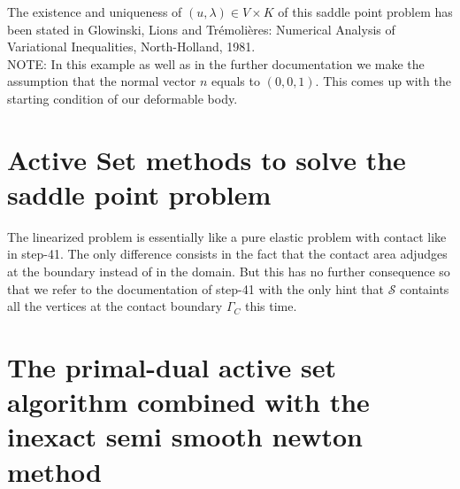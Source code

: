 \documentclass{article}
\begin{document}
\noindent
The existence and uniqueness of $(u,\lambda)\in V\times K$ of this saddle point
problem has been stated in Glowinski, Lions and Tr\'{e}moli\`{e}res: Numerical
Analysis of Variational Inequalities, North-Holland, 1981.\\

\noindent
NOTE: In this example as well as in the further documentation we make the
assumption that the normal vector $n$ equals to $(0,0,1)$. This comes up with
the starting condition of our deformable body.

\section{Active Set methods to solve the saddle point problem}

The linearized problem is essentially like a pure elastic problem with contact like
in step-41. The only difference consists in the fact that the contact area
adjudges at the boundary instead of in the domain. But this has no further consequence
so that we refer to the documentation of step-41 with the only hint that
$\mathcal{S}$ containts all the vertices at the contact boundary $\Gamma_C$ this
time.

\section{The primal-dual active set algorithm combined with the inexact semi smooth
newton method}
\end{document}
